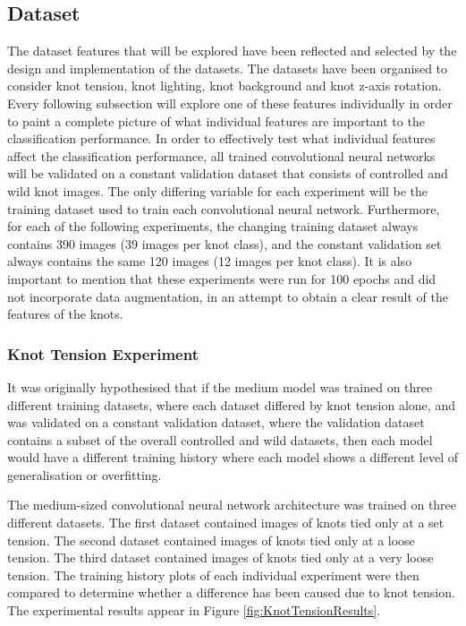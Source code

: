 \documentclass{l4proj}
\begin{document}
\subsection{Dataset}
The dataset features that will be explored have been reflected and selected by the design and implementation of the datasets.
The datasets have been organised to consider knot tension, knot lighting, knot background and knot z-axis rotation.
Every following subsection will explore one of these features individually in order to paint a complete picture of what individual features are important to the classification performance.
In order to effectively test what individual features affect the classification performance, all trained convolutional neural networks will be validated on a constant validation dataset that consists of controlled and wild knot images.
The only differing variable for each experiment will be the training dataset used to train each convolutional neural network.
Furthermore, for each of the following experiments, the changing training dataset always contains 390 images (39 images per knot class), and the constant validation set always contains the same 120 images (12 images per knot class).
It is also important to mention that these experiments were run for 100 epochs and did not incorporate data augmentation, in an attempt to obtain a clear result of the features of the knots. 

\subsubsection{Knot Tension Experiment}
It was originally hypothesised that if the medium model was trained on three different training datasets, where each dataset differed by knot tension alone, and was validated on a constant validation dataset, where the validation dataset contains a subset of the overall controlled and wild datasets, then each model would have a different training history where each model shows a different level of generalisation or overfitting.

The medium-sized convolutional neural network architecture was trained on three different datasets.
The first dataset contained images of knots tied only at a set tension.
The second dataset contained images of knots tied only at a loose tension.
The third dataset contained images of knots tied only at a very loose tension.
The training history plots of each individual experiment were then compared to determine whether a difference has been caused due to knot tension.
The experimental results appear in Figure \ref{fig:KnotTensionResults}.
\end{document}
